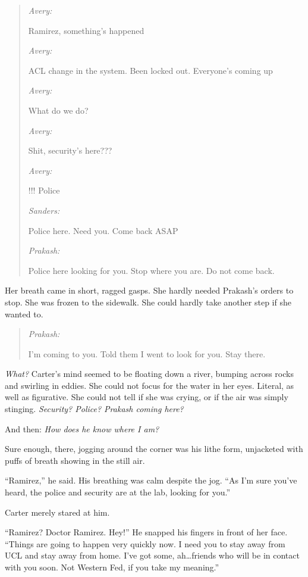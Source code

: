 \begin{quote}
\emph{Avery:}

Ramirez, something's happened

\emph{Avery:}

ACL change in the system. Been locked out. Everyone's coming up

\emph{Avery:}

What do we do?

\emph{Avery:}

Shit, security's here???

\emph{Avery:}

!!! Police

\emph{Sanders:}

Police here. Need you. Come back ASAP

\emph{Prakash:}

Police here looking for you. Stop where you are. Do not come back.
\end{quote}

Her breath came in short, ragged gasps. She hardly needed Prakash's orders to stop. She was frozen to the sidewalk. She could hardly take another step if she wanted to.

\begin{quote}
\emph{Prakash:}

I'm coming to you. Told them I went to look for you. Stay there.
\end{quote}

\emph{What?} Carter's mind seemed to be floating down a river, bumping across rocks and swirling in eddies. She could not focus for the water in her eyes. Literal, as well as figurative. She could not tell if she was crying, or if the air was simply stinging. \emph{Security? Police? Prakash coming here?}

And then: \emph{How does he know where I am?}

Sure enough, there, jogging around the corner was his lithe form, unjacketed with puffs of breath showing in the still air.

``Ramirez,'' he said. His breathing was calm despite the jog. ``As I'm sure you've heard, the police and security are at the lab, looking for you.''

Carter merely stared at him.

``Ramirez? Doctor Ramirez. Hey!'' He snapped his fingers in front of her face. ``Things are going to happen very quickly now. I need you to stay away from UCL and stay away from home. I've got some, ah\ldots{}friends who will be in contact with you soon. Not Western Fed, if you take my meaning.''

